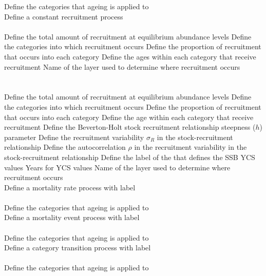  {Define the categories that ageing is applied to}
\\  {Define a constant recruitment process}\\ \\
 {Define the total amount of recruitment at equilibrium abundance levels}
 {Define the categories into which recruitment occurs}
 {Define the proportion of recruitment that occurs into each category}
 {Define the ages within each category that receive recruitment}
 {Name of the layer used to determine where recruitment occurs}
\\ \\ \\
 {Define the total amount of recruitment at equilibrium abundance levels}
 {Define the categories into which recruitment occurs}
 {Define the proportion of recruitment that occurs into each category}
 {Define the age within each category that receive recruitment}
 {Define the Beverton-Holt stock recruitment relationship steepness ($h$) parameter}
 {Define the recruitment variability $\sigma_R$ in the stock-recruitment relationship}
 {Define the autocorrelation $\rho$ in the recruitment variability in the stock-recruitment relationship}
 {Define the label of the  that defines the SSB}
 {YCS values}
 {Years for YCS values}
 {Name of the layer used to determine where recruitment occurs}
\\  {Define a mortality rate process with label}\\ \\
 {Define the categories that ageing is applied to}
\\  {Define a mortality event process with label}\\ \\
 {Define the categories that ageing is applied to}
\\  {Define a category transition process with label}\\ \\
 {Define the categories that ageing is applied to}

